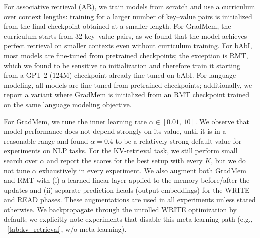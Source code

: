 \documentclass{article}
\theoremstyle{plain}
\theoremstyle{definition}
\theoremstyle{remark}
\begin{document}
{For associative retrieval (AR), we train models from scratch and use a curriculum over context lengths: training for a larger number of key--value pairs is initialized from the final checkpoint obtained at a smaller length. For GradMem, the curriculum starts from 32 key--value pairs, as we found that the model achieves perfect retrieval on smaller contexts even without curriculum training.
For bAbI, most models are fine-tuned from pretrained checkpoints; the exception is RMT, which we found to be sensitive to initialization and therefore train it starting from a GPT-2 (124M) checkpoint already fine-tuned on bAbI.
For language modeling, all models are fine-tuned from pretrained checkpoints; additionally, we report a variant where GradMem is initialized from an RMT checkpoint trained on the same language modeling objective.

For GradMem, we tune the inner learning rate $\alpha \in [0.01,\,10]$. We observe that model performance does not depend strongly on its value, until it is in a reasonable range and found $\alpha=0.4$ to be a relatively strong default value for experiments on NLP tasks. For the KV-retrieval task, we still perform small search over $\alpha$ and report the scores for the best setup with every $K$, but we do not tune $\alpha$ exhaustively in every experiment. We also augment both GradMem and RMT with (i) a learned linear layer applied to the memory before/after the updates and (ii) separate prediction heads (output embeddings) for the WRITE and READ phases. These augmentations are used in all experiments unless stated otherwise. We backpropagate through the unrolled WRITE optimization by default; we explicitly note experiments that disable this meta-learning path (e.g., ~\cref{tab:kv_retrieval}, w/o meta-learning).

}
\end{document}
